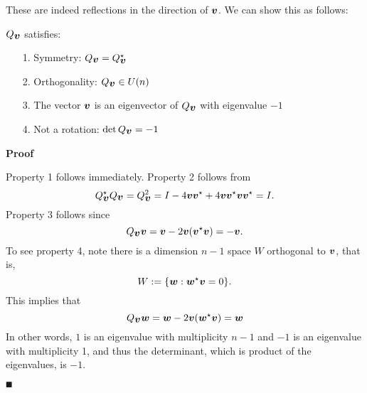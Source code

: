 These are indeed reflections in the direction of $\bm{{\mbox{\boldmath$v$\unboldmath}}}$. We can show this as follows:

\begin{proposition} $Q_{\mbox{\boldmath$v$\unboldmath}}$ satisfies:

\begin{itemize}
\item[1. ] Symmetry: $Q_{\mbox{\boldmath$v$\unboldmath}} = Q_{\mbox{\boldmath$v$\unboldmath}}^\star$


\item[2. ] Orthogonality: $Q_{\mbox{\boldmath$v$\unboldmath}} \in U(n)$


\item[3. ] The vector $\bm{{\mbox{\boldmath$v$\unboldmath}}}$ is an eigenvector of $Q_{\mbox{\boldmath$v$\unboldmath}}$ with eigenvalue $-1$


\item[4. ] Not a rotation: $\det Q_{\mbox{\boldmath$v$\unboldmath}} = -1$

\end{itemize}
\end{proposition}
\textbf{Proof}

Property 1 follows immediately. Property 2 follows from
\[
Q_{\mbox{\boldmath$v$\unboldmath}}^\star Q_{\mbox{\boldmath$v$\unboldmath}} = Q_{\mbox{\boldmath$v$\unboldmath}}^2 = I - 4 \bm{{\mbox{\boldmath$v$\unboldmath}}} \bm{{\mbox{\boldmath$v$\unboldmath}}}^\star + 4 \bm{{\mbox{\boldmath$v$\unboldmath}}} \bm{{\mbox{\boldmath$v$\unboldmath}}}^\star \bm{{\mbox{\boldmath$v$\unboldmath}}} \bm{{\mbox{\boldmath$v$\unboldmath}}}^\star = I.
\]
Property 3 follows since
\[
Q_{\mbox{\boldmath$v$\unboldmath}} \bm{{\mbox{\boldmath$v$\unboldmath}}} = \bm{{\mbox{\boldmath$v$\unboldmath}}} - 2\bm{{\mbox{\boldmath$v$\unboldmath}}} (\bm{{\mbox{\boldmath$v$\unboldmath}}}^\star\bm{{\mbox{\boldmath$v$\unboldmath}}}) = -\bm{{\mbox{\boldmath$v$\unboldmath}}}.
\]
To see property 4, note there is a dimension $n-1$ space $W$ orthogonal to $\bm{{\mbox{\boldmath$v$\unboldmath}}}$, that is,
\[
W := \{\bm{{\mbox{\boldmath$w$\unboldmath}}} : \bm{{\mbox{\boldmath$w$\unboldmath}}}^\star \bm{{\mbox{\boldmath$v$\unboldmath}}} = 0 \}.
\]
This implies that
\[
Q_{\mbox{\boldmath$v$\unboldmath}} \bm{{\mbox{\boldmath$w$\unboldmath}}} = \bm{{\mbox{\boldmath$w$\unboldmath}}} - 2 \bm{{\mbox{\boldmath$v$\unboldmath}}} (\bm{{\mbox{\boldmath$w$\unboldmath}}}^\star \bm{{\mbox{\boldmath$v$\unboldmath}}}) =  \bm{{\mbox{\boldmath$w$\unboldmath}}}
\]
In other words, $1$ is an eigenvalue with multiplicity $n-1$ and $-1$ is an eigenvalue with multiplicity 1, and thus the determinant, which is product of the eigenvalues, is $-1$.

\ensuremath{\QED}

